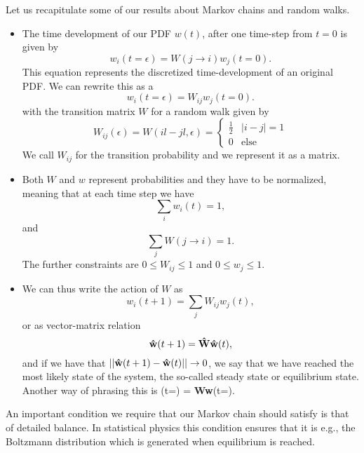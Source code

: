 Let us recapitulate some of our results about Markov chains and random walks.
\begin{itemize}
\item The time development of our PDF $w(t)$, after one time-step from $t=0$ is given by
\[
   w_i(t=\epsilon) = W(j\rightarrow i)w_j(t=0).
\]   
This equation represents the discretized time-development of an original 
PDF.  We can rewrite this as a 
\[
   w_i(t=\epsilon) = W_{ij}w_j(t=0).
\]
with the transition matrix $W$ for a random walk given by
\[
   W_{ij}(\epsilon)=W(il-jl,\epsilon)=\left\{\begin{array}{cc}\frac{1}{2} & |i-j| = 1\\
                                             0 & \mathrm{else} \end{array} \right.
\]
We call $W_{ij}$ for the transition probability and we represent it
as a matrix. 
\item Both  $W$ and $w$ represent probabilities and they have to be normalized, meaning that at each time step we have 
\[
   \sum_i w_i(t) = 1, 
\]
and 
\[ 
   \sum_j W(j\rightarrow i) = 1.
\]
The further constraints are
$0 \le W_{ij} \le 1$  and  $0 \le w_{j} \le 1$.
\item We can thus write the action of $W$ as 
\[
   w_i(t+1) = \sum_jW_{ij}w_j(t),
\]
or as vector-matrix relation
\[
   {\bf \hat{w}}(t+1) = {\bf \hat{W}\hat{w}}(t),
\]
and if we have that $||{\bf \hat{w}}(t+1)-{\bf \hat{w}}(t)||\rightarrow 0$, we say that 
we have reached the most likely state of the system, the so-called steady state or equilibrium state.
Another way of phrasing this is
       (t=\infty) = {\bf Ww}(t=\infty). \ee   
\label{eq:finalstage}
\end{itemize}
An important condition we require that our Markov chain should satisfy is that of
detailed balance. In statistical physics this condition ensures that it is e.g., the 
Boltzmann distribution which is generated when equilibrium is reached.

